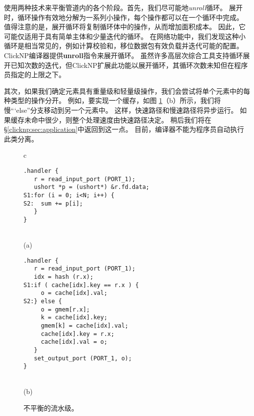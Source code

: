 \name 使用两种技术来平衡管道内的各个阶段。首先，我们尽可能地\textit {unroll}循环。
展开时，循环操作有效地分解为一系列小操作，每个操作都可以在一个循环中完成。
值得注意的是，展开循环将复制循环体中的操作，从而增加面积成本。
因此，它可能仅适用于具有简单主体和少量迭代的循环。
在网络功能中，我们发现这种小循环是相当常见的，例如计算校验和，移位数据包有效负载并迭代可能的配置。
ClickNP编译器提供\textbf {unroll}指令来展开循环。
虽然许多高层次综合工具支持循环展开已知次数的迭代，但ClickNP扩展此功能以展开循环，其循环次数未知但在程序员指定的上限之下。

\iffalse
\textbf{提供 pragma 让程序员指定最高循环次数}
\fi

其次，如果我们确定元素具有重量级和轻量级操作，我们会尝试将单个元素中的每种类型的操作分开。
例如，要实现一个缓存，如图 \ref {clicknp:fig:unbalance}（b）所示，我们将慢“`else”分支移动到另一个元素中。
这样，快速路径和慢速路径将异步运行。
如果缓存未命中很少，则整个处理速度由快速路径决定。
稍后我们将在\S \ref {clicknp:sec:application}中返回到这一点。
目前，\name 编译器不能为程序员自动执行此类分离。

\iffalse
\textbf{讨论 async}。

\textbf{更新 ClickNP 语法，端口名称}。
\fi


\begin{figure}
\lstset{style=numbers}

\centering

\begin{tabular}{c}
{
\small
\begin{lstlisting}[escapechar=@]
.handler {
   r = read_input_port (PORT_1);
   ushort *p = (ushort*) &r.fd.data;
S1:for (i = 0; i<N; i++) {
S2:  sum += p[i];
   }
}
\end{lstlisting} 
} \\
(a) \vspace{3pt} \\
{
\small 
\begin{lstlisting}[escapechar=@]
.handler {
   r = read_input_port (PORT_1);
   idx = hash (r.x);
S1:if ( cache[idx].key == r.x ) {
     o = cache[idx].val;
S2:} else {
     o = gmem[r.x];
     k = cache[idx].key;
     gmem[k] = cache[idx].val;
     cache[idx].key = r.x;
     cache[idx].val = o;
   }
   set_output_port (PORT_1, o);
}
\end{lstlisting} 
} \\
(b) \vspace{3pt} 
\end{tabular}

\caption{不平衡的流水级。}
\label{clicknp:fig:unbalance}

\end{figure}


